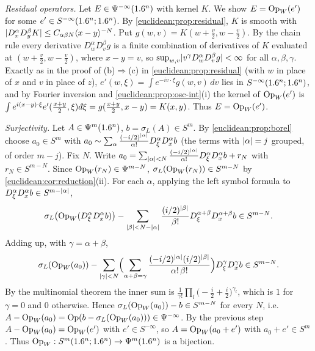 \emph{Residual operators.} Let $E\in\Psi^{-\infty}(1.6^n)$ with kernel $K$. We show
$E=\operatorname{Op}_W(e')$ for some $e'\in S^{-\infty}(1.6^n;1.6^n)$. By
\cref{euclidean:prop:residual}, $K$ is smooth with
$\lvert D^\alpha_xD^\beta_yK\rvert\le C_{\alpha\beta N}\langle x-y\rangle^{-N}$. Put
$g(w,v)=K(w+\frac v2,w-\frac v2)$. By the chain rule every derivative
$D^\alpha_wD^\beta_vg$ is a finite combination of derivatives of $K$ evaluated at
$(w+\frac v2,w-\frac v2)$, where $x-y=v$, so
$\sup_{w,v}\lvert v^\gamma D^\alpha_wD^\beta_vg\rvert<\infty$ for all $\alpha,\beta,\gamma$. Exactly
as in the proof of (b)$\Rightarrow$(c) in \cref{euclidean:prop:residual} (with $w$ in place
of $x$ and $v$ in place of $z$), $e'(w,\xi)=\int e^{-iv\cdot\xi}g(w,v)\,dv$ lies in
$S^{-\infty}(1.6^n;1.6^n)$, and by Fourier inversion and \cref{euclidean:prop:osc-int}(i) the
kernel of $\operatorname{Op}_W(e')$ is $\int e^{i(x-y)\cdot\xi}e'(\frac{x+y}2,\xi)\,\dbar\xi
=g(\frac{x+y}2,x-y)=K(x,y)$. Thus $E=\operatorname{Op}_W(e')$.

\emph{Surjectivity.} Let $A\in\Psi^{m}(1.6^n)$, $b=\sigma_L(A)\in S^m$. By
\cref{euclidean:prop:borel} choose $a_0\in S^m$ with
$a_0\sim\sum_\alpha\frac{(-i/2)^{\lvert \alpha\rvert}}{\alpha!}D^\alpha_\xi D^\alpha_xb$ (the terms with
$\lvert \alpha\rvert=j$ grouped, of order $m-j$). Fix $N$. Write
$a_0=\sum_{\lvert \alpha\rvert<N}\frac{(-i/2)^{\lvert \alpha\rvert}}{\alpha!}D^\alpha_\xi D^\alpha_xb+r_N$ with
$r_N\in S^{m-N}$. Since $\operatorname{Op}_W(r_N)\in\Psi^{m-N}$, $\sigma_L(\operatorname{Op}_W(r_N))\in S^{m-N}$ by
\cref{euclidean:cor:reduction}(ii). For each $\alpha$, applying the left symbol formula to
$D^\alpha_\xi D^\alpha_xb\in S^{m-\lvert \alpha\rvert}$,
\begin{equation*}
  \sigma_L\bigl(\operatorname{Op}_W(D^\alpha_\xi D^\alpha_xb)\bigr)-\sum_{\lvert \beta\rvert<N-\lvert \alpha\rvert}
  \frac{(i/2)^{\lvert \beta\rvert}}{\beta!}D^{\alpha+\beta}_\xi D^{\alpha+\beta}_xb\in S^{m-N}.
\end{equation*}
Adding up, with $\gamma=\alpha+\beta$,
\begin{equation*}
  \sigma_L(\operatorname{Op}_W(a_0))-\sum_{\lvert \gamma\rvert<N}\Bigl(\sum_{\alpha+\beta=\gamma}
  \frac{(-i/2)^{\lvert \alpha\rvert}(i/2)^{\lvert \beta\rvert}}{\alpha!\,\beta!}\Bigr)D^\gamma_\xi D^\gamma_xb\in S^{m-N}.
\end{equation*}
By the multinomial theorem the inner sum is
$\frac1{\gamma!}\prod_l\bigl(-\frac i2+\frac i2\bigr)^{\gamma_l}$, which is $1$ for
$\gamma=0$ and $0$ otherwise. Hence $\sigma_L(\operatorname{Op}_W(a_0))-b\in S^{m-N}$ for every $N$,
i.e.\ $A-\operatorname{Op}_W(a_0)=\operatorname{Op}(b-\sigma_L(\operatorname{Op}_W(a_0)))\in\Psi^{-\infty}$. By the previous step
$A-\operatorname{Op}_W(a_0)=\operatorname{Op}_W(e')$ with $e'\in S^{-\infty}$, so $A=\operatorname{Op}_W(a_0+e')$ with
$a_0+e'\in S^m$. Thus $\operatorname{Op}_W:S^m(1.6^n;1.6^n)\to\Psi^{m}(1.6^n)$ is a bijection.

